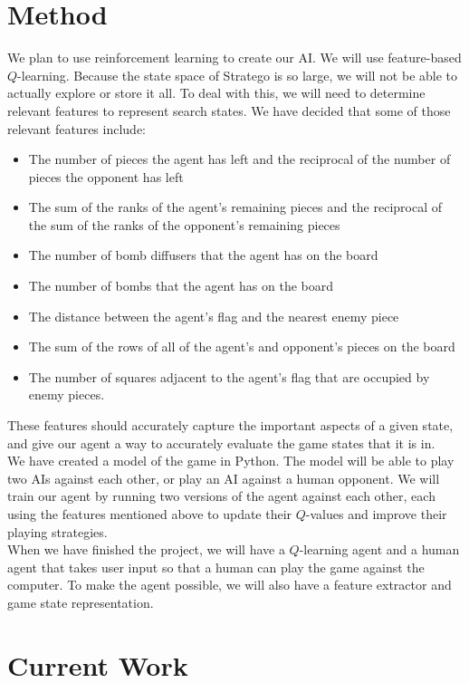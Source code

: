 \documentclass[letterpaper]{article}
\begin{document}
\section{Method}
We plan to use reinforcement learning to create our AI. We will use feature-based $Q$-learning. Because the state space of Stratego is so large, we will not be able to actually explore or store it all. To deal with this, we will need to determine relevant features to represent search states. We have decided that some of those relevant features include: 
\begin{itemize}
\item The number of pieces the agent has left and the reciprocal of the number of pieces the opponent has left
\item The sum of the ranks of the agent's remaining pieces and the reciprocal of the sum of the ranks of the opponent's remaining pieces
\item The number of bomb diffusers that the agent has on the board 
\item The number of bombs that the agent has on the board 
\item The distance between the agent's flag and the nearest enemy piece 
\item  The sum of the rows of all of the agent's and opponent's pieces on the board
\item The number of squares adjacent to the agent's flag that are occupied by enemy pieces.
\end{itemize}
These features should accurately capture the important aspects of a given state, and give our agent a way to accurately evaluate the game states that it is in.\\

We have created a model of the game in Python. The model will be able to play two AIs against each other, or play an AI against a human opponent. We will train our agent by running two versions of the agent against each other, each using the features mentioned above to update their $Q$-values and improve their playing strategies.\\

When we have finished the project, we will have a $Q$-learning agent and a human agent that takes user input so that a human can play the game against the computer. To make the agent possible, we will also have a feature extractor and game state representation.\\

\section{Current Work}
\end{document}
